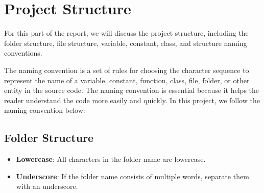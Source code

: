 \section{Project Structure}
\label{sec:project-structure-section}

\hspace{1cm} For this part of the report, we will discuss the project structure, including the folder structure, file structure, variable, constant, class, and structure naming conventions. 

\vspace{0.5cm}

\hspace{1cm} The naming convention is a set of rules for choosing the character sequence to represent the name of a variable, constant, function, class, file, folder, or other entity in the source code. The naming convention is essential because it helps the reader understand the code more easily and quickly. In this project, we follow the naming convention below:

\subsection{Folder Structure}
\begin{itemize}
    \item \textbf{Lowercase}: All characters in the folder name are lowercase.
    \item \textbf{Underscore}: If the folder name consists of multiple words, separate them with an underscore.
\end{itemize}

